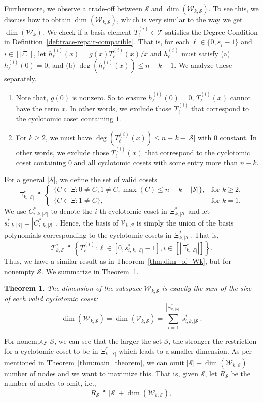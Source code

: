 \documentclass[onecolumn]{IEEEtran}
\theoremstyle{plain}
\newtheorem{theorem}{Theorem}
\theoremstyle{definition}
\newcommand{\cS}{\mathcal{S}}
\newcommand{\cT}{\mathcal{T}}
\newcommand{\cW}{\mathcal{W}}
\newcommand{\cV}{\mathcal{V}}
\begin{document}
Furthermore, we observe a trade-off between $\cS$ and $\dim(\cW_{k,\cS})$. To see this, we discuss how to obtain $\dim(\cW_{k,\cS})$, which is very similar to the way we get $\dim(\cW_k)$. We check if a basis element $T_\ell^{(i)}\in\cT$ satisfies the Degree Condition in Definition~\ref{def:trace-repair-compatible}. That is, for each $\ell\in\{0,s_i-1\}$ and $i\in[|\Xi|]$, let $h_\ell^{(i)}(x) = g(x)T_\ell^{(i)}(x)/x$ and $h_\ell^{(i)}$ must satisfy (a) $h_\ell^{(i)}(0) = 0$, and (b) $\deg(h_\ell^{(i)}(x))\le n-k-1$. We analyze these separately.
\begin{enumerate}[label = (\alph*)]
    \item Note that, $g(0)$ is nonzero. So to ensure $h_\ell^{(i)}(0) = 0$, $T_\ell^{(i)}(x)$ cannot have the term $x$. In other words, we exclude those $T_\ell^{(i)}$ that correspond to the cyclotomic coset containing $1$.
    \item For $k\ge 2$, we must have $\deg(T_\ell^{(i)}(x))\le n-k-|\cS|$ with $0$ constant. In other words, we exclude those $T_\ell^{(i)}(x)$ that correspond to the cyclotomic coset containing $0$ and all cyclotomic cosets with some entry more than $n-k$.
\end{enumerate}
For a general $|\cS|$, we define the set of valid cosets
$$
\Xi_{k,|\cS|}^* \triangleq \begin{cases}
    \{C\in\Xi:0\ne C,1\ne C,\max(C)\le n-k-|\cS|\}, &\text{for }k\ge 2,\\
    \{C\in\Xi:1\ne C\}, &\text{for }k = 1.
\end{cases}
$$
We use $C_{i,k,|\cS|}^*$ to denote the $i$-th cyclotomic coset in $\Xi_{k,|\cS|}^*$ and let $s_{i,k,|\cS|}^* = |C_{i,k,|\cS|}^*|$. Hence, the basis of $\cV_{k,\cS}$ is simply the union of the basis polynomials corresponding to the cyclotomic cosets in $\Xi_{k,|\cS|}^*$. That is, 
$$
\cT_{k,\cS}^{*} \triangleq \left\{T_{\ell}^{(i)}:\ell\in[0,s_{i,k,|\cS|}^*-1], i\in[|\Xi_{k,|\cS|}^*|]\right\}.
$$
Thus, we have a similar result as in Theorem~\ref{thm:dim_of_Wk}, but for nonempty $\cS$. We summarize in Theorem~\ref{thm:dim_of_WkS}.
\begin{theorem}\label{thm:dim_of_WkS}
    The dimension of the subspace $\cW_{k,\cS}$ is exactly the sum of the size of each valid cyclotomic coset:
    $$
    \dim(\cW_{k,\cS}) = \dim(\cV_{k,\cS}) = \sum_{i=1}^{|\Xi_{k,|\cS|}^*|} s_{i,k,|\cS|}^*.
    $$
\end{theorem}
For nonempty $\cS$, we can see that the larger the set $\cS$, the stronger the restriction for a cyclotomic coset to be in $\Xi_{k,|\cS|}^*$ which leads to a smaller dimension. As per mentioned in Theorem~\ref{thm:main_theorem}, we can omit $|\cS| + \dim(\cW_{k,\cS})$ number of nodes and we want to maximize this. That is, given $\cS$, let $R_\cS$ be the number of nodes to omit, i.e., $$R_{\cS} \triangleq|\cS| + \dim({\cW_{k,\cS}}),$$
\end{document}
